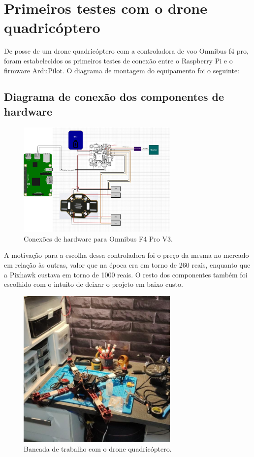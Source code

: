 \documentclass[12pt,a4paper,oneside]{book}
\begin{document}
\section{Primeiros testes com o drone quadricóptero}

De posse de um drone quadricóptero com a controladora de voo Omnibus f4 pro, foram estabelecidos os primeiros testes de conexão entre o Raspberry Pi e o firmware ArduPilot. O diagrama de montagem do equipamento foi o seguinte:

\subsection{Diagrama de conexão dos componentes de hardware}
%
\begin{figure}[!htbp]
  \centering
  \includegraphics[width=0.7\textwidth]{Images/Diagramas/hardware_connections.png}
  \caption{Conexões de hardware para Omnibus F4 Pro V3.}
  \label{fig:hardware_connections.png.0}
\end{figure}
%
A motivação para a escolha dessa controladora foi o preço da mesma no mercado em relação às outras, valor que na época era em torno de 260 reais, enquanto que a Pixhawk custava em torno de 1000 reais. O resto dos componentes também foi escolhido com o intuito de deixar o projeto em baixo custo. 
%
\begin{figure}[!htbp]
  \centering
  \includegraphics[width=0.7\textwidth]{Images/Desenvolvimento/omnibus_drone.jpeg}
  \caption{Bancada de trabalho com o drone quadricóptero.}
  \label{fig:omnibus_drone.jpeg.0}
\end{figure}
%
\end{document}

